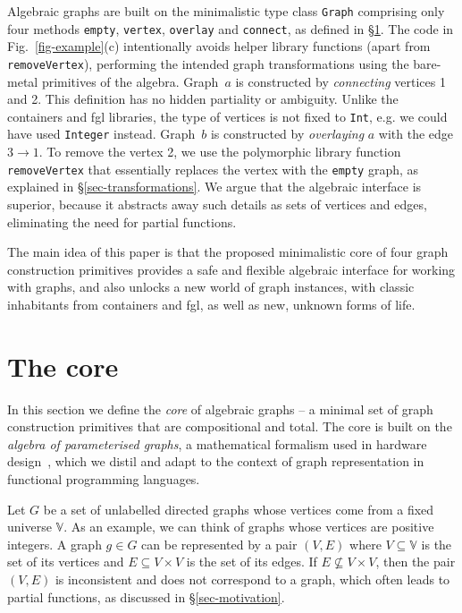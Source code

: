 \documentclass[acmlarge,anonymous]{acmart}\settopmatter{printfolios=true}
\newcommand{\hs}{\texttt}
\begin{document}
Algebraic graphs are built on the minimalistic type class \hs{Graph} comprising
only four methods \hs{empty}, \hs{vertex}, \hs{overlay} and \hs{connect}, as
defined in \S\ref{sec-core}. The code in
Fig.~\ref{fig-example}(c) intentionally avoids helper library functions (apart
from \hs{removeVertex}), performing the intended graph transformations using the
bare-metal primitives of the algebra. Graph~$a$ is constructed by \emph{connecting}
vertices 1 and 2. This definition has no hidden partiality or ambiguity.
Unlike the \textsf{containers} and \textsf{fgl} libraries, the type of vertices
is not fixed to \hs{Int}, e.g. we could have used \hs{Integer} instead.
Graph~$b$ is constructed by \emph{overlaying} $a$ with the edge $3 \rightarrow 1$.
To remove the vertex 2, we use the polymorphic library function
\hs{removeVertex} that essentially replaces the vertex with the \hs{empty} graph,
as explained in \S\ref{sec-transformations}. We argue that the algebraic
interface is superior, because it abstracts away such details as sets of
vertices and edges, eliminating the need for partial functions.

The main idea of this paper is that the proposed minimalistic core of four graph
construction primitives provides a safe and flexible algebraic interface
for working with graphs, and also unlocks a new world of graph instances, with
classic inhabitants from \textsf{containers} and \textsf{fgl}, as well
as new, unknown forms of life.

\section{The core}\label{sec-core}

In this section we define the \emph{core} of algebraic graphs -- a minimal set
of graph construction primitives that are compositional and total. The core is
built on the \emph{algebra of parameterised graphs}, a mathematical formalism
used in hardware design~\cite{2014_algebra_mokhov},
which we distil and adapt to the context of graph representation in functional
programming languages.

Let $G$ be a set of unlabelled directed graphs whose vertices come from a fixed
universe $\mathbb{V}$. As an example, we can think of graphs whose vertices are
positive integers. A graph $g \in G$ can be represented by a pair $(V, E)$ where
$V\subseteq \mathbb{V}$ is the set of its vertices and $E \subseteq V \times V$ is
the set of its edges.
If $E \nsubseteq V \times V$, then the pair $(V, E)$ is inconsistent and does not
correspond to a graph, which often leads to partial functions, as discussed
in \S\ref{sec-motivation}.
\end{document}
